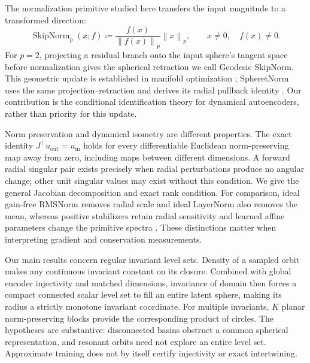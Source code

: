 \documentclass[10pt]{article}
\theoremstyle{definition}
\theoremstyle{remark}
\newcommand{\norm}[1]{\left\lVert #1 \right\rVert}
\begin{document}
The normalization primitive studied here transfers the input magnitude to a transformed direction:
\begin{equation}
    \operatorname{SkipNorm}_p(x; f) \coloneqq \frac{f(x)}{\norm{f(x)}_p} \norm{x}_p, \qquad x \ne 0,\quad f(x)\ne0.
    \label{eq:skipnorm_def}
\end{equation}
For $p=2$, projecting a residual branch onto the input sphere's tangent space before normalization gives the spherical retraction we call Geodesic SkipNorm. This geometric update is established in manifold optimization \citep{absil2008optimization}; SpheretNorm uses the same projection--retraction and derives its radial pullback identity \citep{zhang2026spheretnorm}. Our contribution is the conditional identification theory for dynamical autoencoders, rather than priority for this update.

Norm preservation and dynamical isometry are different properties. The exact identity $J^\top u_{\mathrm{out}}=u_{\mathrm{in}}$ holds for every differentiable Euclidean norm-preserving map away from zero, including maps between different dimensions. A forward radial singular pair exists precisely when radial perturbations produce no angular change; other unit singular values may exist without this condition. We give the general Jacobian decomposition and exact rank condition. For comparison, ideal gain-free RMSNorm removes radial scale and ideal LayerNorm also removes the mean, whereas positive stabilizers retain radial sensitivity and learned affine parameters change the primitive spectra \citep{ba2016layer, zhang2019root}. These distinctions matter when interpreting gradient and conservation measurements.

Our main results concern regular invariant level sets. Density of a sampled orbit makes any continuous invariant constant on its closure. Combined with global encoder injectivity and matched dimensions, invariance of domain then forces a compact connected scalar level set to fill an entire latent sphere, making its radius a strictly monotone invariant coordinate. For multiple invariants, $K$ planar norm-preserving blocks provide the corresponding product of circles. The hypotheses are substantive: disconnected basins obstruct a common spherical representation, and resonant orbits need not explore an entire level set. Approximate training does not by itself certify injectivity or exact intertwining.
\end{document}
